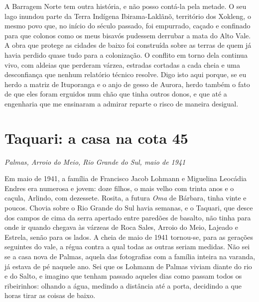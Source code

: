 \documentclass[
  brazilian,
  11pt,
  openany]{book}
\begin{document}
A Barragem Norte tem outra história, e não posso contá-la pela metade. O
seu lago inundou parte da Terra Indígena Ibirama-Laklãnõ, território dos
Xokleng, o mesmo povo que, no início do século passado, foi empurrado,
caçado e confinado para que colonos como os meus bisavós pudessem
derrubar a mata do Alto Vale. A obra que protege as cidades de baixo foi
construída sobre as terras de quem já havia perdido quase tudo para a
colonização. O conflito em torno dela continua vivo, com aldeias que
perderam várzea, estradas cortadas a cada cheia e uma desconfiança que
nenhum relatório técnico resolve. Digo isto aqui porque, se eu herdo a
matriz de Ituporanga e o anjo de gesso de Aurora, herdo também o fato de
que eles foram erguidos num chão que tinha outros donos, e que até a
engenharia que me ensinaram a admirar reparte o risco de maneira
desigual.

\section{Taquari: a casa na cota 45}\label{taquari-a-casa-na-cota-45}

\emph{Palmas, Arroio do Meio, Rio Grande do Sul, maio de 1941}

Em maio de 1941, a família de Francisco Jacob Lohmann e Miguelina
Leocádia Endres era numerosa e jovem: doze filhos, o mais velho com
trinta anos e o caçula, Arlindo, com dezessete. Rosita, a futura
\emph{Oma} de Bárbara, tinha vinte e poucos. Chovia sobre o Rio Grande
do Sul havia semanas, e o Taquari, que desce dos campos de cima da serra
apertado entre paredões de basalto, não tinha para onde ir quando
chegava às várzeas de Roca Sales, Arroio do Meio, Lajeado e Estrela,
senão para os lados. A cheia de maio de 1941 tornou-se, para as gerações
seguintes do vale, a régua contra a qual todas as outras seriam medidas.
Não sei se a casa nova de Palmas, aquela das fotografias com a família
inteira na varanda, já estava de pé naquele ano. Sei que os Lohmann de
Palmas viviam diante do rio e do Salto, e imagino que tenham passado
aqueles dias como passam todos os ribeirinhos: olhando a água, medindo a
distância até a porta, decidindo a que horas tirar as coisas de baixo.
\end{document}

